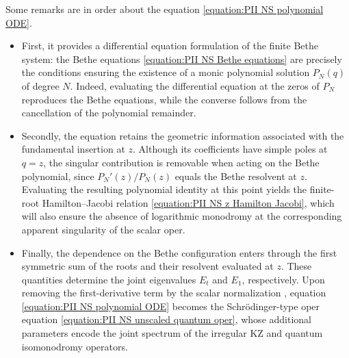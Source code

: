 \documentclass[a4paper,11pt]{article}
\numberwithin{equation}{section}
\begin{document}
Some remarks are in order about the equation \eqref{equation:PII NS polynomial ODE}. 
\begin{itemize}
\item First, it provides a differential equation formulation of the finite Bethe system: the Bethe equations  \eqref{equation:PII NS Bethe equations} are precisely the conditions ensuring the existence of a monic polynomial solution $P_N(q)$ of degree $N$. Indeed, evaluating the differential equation at the zeros of $P_N$ reproduces the Bethe equations, while the converse follows from the cancellation of the polynomial remainder.

\item Secondly, the equation retains the geometric information associated with the fundamental insertion at $z$. Although its coefficients have simple poles at $q=z$, the singular contribution is removable when acting on the Bethe polynomial, since $P_N'(z)/P_N(z)$ equals the Bethe resolvent at $z$. Evaluating the resulting polynomial identity at this point yields the finite-root Hamilton–Jacobi relation \eqref{equation:PII NS z Hamilton Jacobi}, which will also ensure the absence of logarithmic monodromy at the corresponding apparent singularity of the scalar oper.

\item Finally, the dependence on the Bethe configuration enters through the first symmetric sum of the roots and their resolvent evaluated at $z$. These quantities determine the joint eigenvalues $E_t$ and $E_1$, respectively. Upon removing the first-derivative term by the scalar normalization , equation \eqref{equation:PII NS polynomial ODE} becomes the Schr\"odinger-type oper equation \eqref{equation:PII NS unscaled quantum oper}, whose additional parameters encode the joint spectrum of the irregular KZ and quantum isomonodromy operators. 

\end{itemize}

\end{document}
